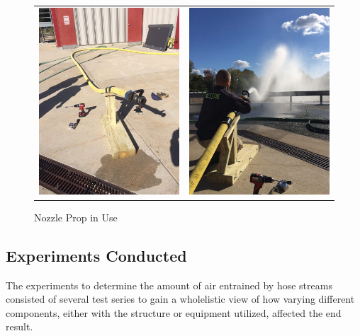 \documentclass{article}
\begin{document}
\begin{figure}[!ht]
\centering
\begin{tabular*}{\textwidth}{cc}
\includegraphics[width=2.5in]{Figures/Air_Entrainment/Old_Gib.jpg} &
\includegraphics[width=2.5in]{Figures/Air_Entrainment/Old_Gib_1.jpg} \\
\end{tabular*}
\caption{Nozzle Prop in Use}
\label{fig:Nozzle_Prop_in_Use}
\end{figure}

\clearpage

\subsection{Experiments Conducted}

The experiments to determine the amount of air entrained by hose streams consisted of several test series to gain a wholelistic view of how varying different components, either with the structure or equipment utilized, affected the end result.
\end{document}

